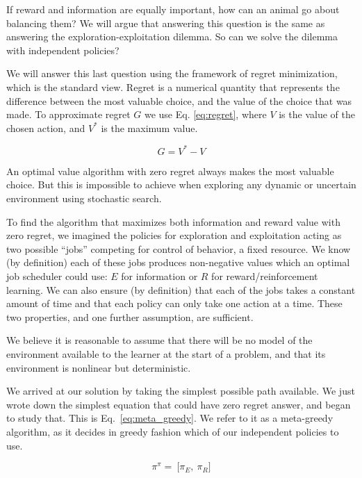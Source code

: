 If reward and information are equally important, how can an animal go about balancing them? We will argue that answering this question is the same as answering the exploration-exploitation dilemma. So can we solve the dilemma with independent policies? 

We will answer this last question using the framework of regret minimization, which is the standard view. Regret is a numerical quantity that represents the difference between the most valuable choice, and the value of the choice that was made. To approximate regret $G$ we use Eq. \ref{eq:regret}, where $V$ is the value of the chosen action, and $V^*$ is the maximum value. 

\begin{equation}
\label{eq:regret}
	G = V^* - V
\end{equation}

An optimal value algorithm with zero regret always makes the most valuable choice. But this is impossible to achieve when exploring any dynamic or uncertain environment using stochastic search. 

To find the algorithm that maximizes both information and reward value with zero regret, we imagined the policies for exploration and exploitation acting as two possible ``jobs'' competing for control of behavior, a fixed resource. We know (by definition) each of these jobs produces non-negative values which an optimal job scheduler could use: $E$ for information or $R$ for reward/reinforcement learning. We can also ensure (by definition) that each of the jobs takes a constant amount of time and that each policy can only take one action at a time. These two properties, and one further assumption, are sufficient.

We believe it is reasonable to assume that there will be no model of the environment available to the learner at the start of a problem, and that its environment is nonlinear but deterministic. 

We arrived at our solution by taking the simplest possible path available. We just wrote down the simplest equation that could have zero regret answer, and began to study that. This is Eq.~\ref{eq:meta_greedy}. We refer to it as a meta-greedy algorithm, as it decides in greedy fashion which of our independent policies to use.

\begin{equation}
\label{eq:pipi} 
\pi^{\pi} = \ \Big [ \pi_E,\ \pi_R \Big ]
\end{equation}

